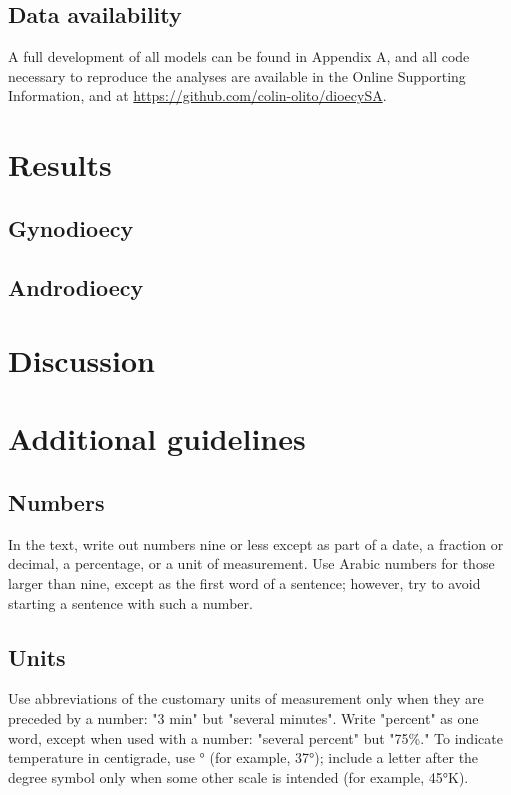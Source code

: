\documentclass[9pt,twocolumn,twoside,lineno]{gsajnl}
\begin{document}
\subsection{Data availability}
A full development of all models can be found in Appendix A, and all code necessary to reproduce the analyses are available in the Online Supporting Information, and at \url{https://github.com/colin-olito/dioecySA}.


\section{Results}

\subsection{Gynodioecy}

\subsection{Androdioecy}

\section{Discussion}



\section{Additional guidelines}

\subsection{Numbers} In the text, write out numbers nine or less except as part of a date, a fraction or decimal, a percentage, or a unit of measurement. Use Arabic numbers for those larger than nine, except as the first word of a sentence; however, try to avoid starting a sentence with such a number.

\subsection{Units} Use abbreviations of the customary units of measurement only when they are preceded by a number: "3 min" but "several minutes". Write "percent" as one word, except when used with a number: "several percent" but "75\%." To indicate temperature in centigrade, use ° (for example, 37°); include a letter after the degree symbol only when some other scale is intended (for example, 45°K).
\end{document}

